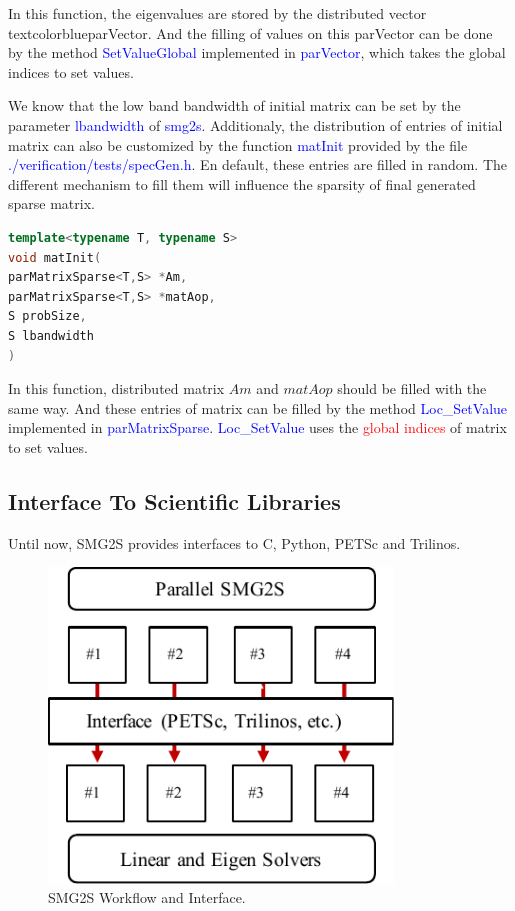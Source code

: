 In this function, the eigenvalues are stored by the distributed vector textcolor{blue}{parVector}. And the filling of values on this parVector can be done by  the method \textcolor{blue}{SetValueGlobal} implemented in \textcolor{blue}{parVector}, which takes the global indices to set values.

We know that the low band bandwidth of initial matrix can be set by the parameter  \textcolor{blue}{lbandwidth} of \textcolor{blue}{smg2s}. Additionaly, the distribution of entries of initial matrix can also be customized by the function  \textcolor{blue}{matInit} provided by the file \textcolor{blue}{./verification/tests/specGen.h}. En default, these entries are filled in random. The different mechanism to fill them will influence the sparsity of final generated sparse matrix.

\begin{lstlisting}[language=C++,frame=single]
template<typename T, typename S>
void matInit(
parMatrixSparse<T,S> *Am, 
parMatrixSparse<T,S> *matAop, 
S probSize, 
S lbandwidth
)
\end{lstlisting}

In this function, distributed matrix $Am$ and $matAop$ should be filled with the same way. And these entries of matrix can be filled by the method \textcolor{blue}{Loc\_SetValue} implemented in \textcolor{blue}{parMatrixSparse}. \textcolor{blue}{Loc\_SetValue} uses the \textcolor{red}{global indices} of matrix to set values.

\subsection{Interface To Scientific Libraries}

Until now, SMG2S provides interfaces to C, Python, PETSc and Trilinos.

\begin{figure}[htbp]
	\centering
	\includegraphics[width=3.6in]{fig/interface.pdf}
	\caption{SMG2S Workflow and Interface.}
	\label{fig:interface}
\end{figure}


